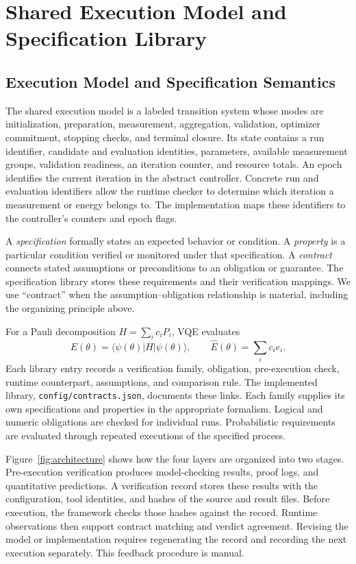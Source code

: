 \documentclass[conference]{IEEEtran}
\newcommand{\Ehat}{\widehat E}
\begin{document}
\section{Shared Execution Model and Specification Library}
\label{sec:model}
\subsection{Execution Model and Specification Semantics}
The shared execution model is a labeled transition system whose modes are initialization, preparation, measurement, aggregation, validation, optimizer commitment, stopping checks, and terminal closure. Its state contains a run identifier, candidate and evaluation identities, parameters, available measurement groups, validation readiness, an iteration counter, and resource totals. An epoch identifies the current iteration in the abstract controller. Concrete run and evaluation identifiers allow the runtime checker to determine which iteration a measurement or energy belongs to. The implementation maps these identifiers to the controller's counters and epoch flags.

A \emph{specification} formally states an expected behavior or condition. A \emph{property} is a particular condition verified or monitored under that specification. A \emph{contract} connects stated assumptions or preconditions to an obligation or guarantee. The specification library stores these requirements and their verification mappings. We use ``contract'' when the assumption--obligation relationship is material, including the organizing principle above.

For a Pauli decomposition $H=\sum_i c_iP_i$, VQE evaluates
\begin{equation}
 E(\theta)=\langle\psi(\theta)|H|\psi(\theta)\rangle,
 \qquad \Ehat(\theta)=\sum_i c_i\hat e_i.
 \label{eq:energy}
\end{equation}
Each library entry records a verification family, obligation, pre-execution check, runtime counterpart, assumptions, and comparison rule. The implemented library, \texttt{config/contracts.json}, documents these links. Each family supplies its own specifications and properties in the appropriate formalism. Logical and numeric obligations are checked for individual runs. Probabilistic requirements are evaluated through repeated executions of the specified process.

Figure~\ref{fig:architecture} shows how the four layers are organized into two stages. Pre-execution verification produces model-checking results, proof logs, and quantitative predictions. A verification record stores these results with the configuration, tool identities, and hashes of the source and result files. Before execution, the framework checks those hashes against the record. Runtime observations then support contract matching and verdict agreement. Revising the model or implementation requires regenerating the record and recording the next execution separately. This feedback procedure is manual.
\end{document}
